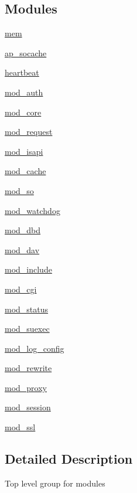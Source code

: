 \subsection*{Modules}
\begin{DoxyCompactItemize}
\item 
\hyperlink{group__MEM}{mem}
\item 
\hyperlink{group__AP__SOCACHE}{ap\+\_\+socache}
\item 
\hyperlink{group__HEARTBEAT}{heartbeat}
\item 
\hyperlink{group__MOD__AUTH}{mod\+\_\+auth}
\item 
\hyperlink{group__MOD__CORE}{mod\+\_\+core}
\item 
\hyperlink{group__MOD__REQUEST}{mod\+\_\+request}
\item 
\hyperlink{group__MOD__ISAPI}{mod\+\_\+isapi}
\item 
\hyperlink{group__MOD__CACHE}{mod\+\_\+cache}
\item 
\hyperlink{group__MOD__SO}{mod\+\_\+so}
\item 
\hyperlink{group__MOD__WATCHDOG}{mod\+\_\+watchdog}
\item 
\hyperlink{group__MOD__DBD}{mod\+\_\+dbd}
\item 
\hyperlink{group__MOD__DAV}{mod\+\_\+dav}
\item 
\hyperlink{group__MOD__INCLUDE}{mod\+\_\+include}
\item 
\hyperlink{group__MOD__CGI}{mod\+\_\+cgi}
\item 
\hyperlink{group__MOD__STATUS}{mod\+\_\+status}
\item 
\hyperlink{group__MOD__SUEXEC}{mod\+\_\+suexec}
\item 
\hyperlink{group__MOD__LOG__CONFIG}{mod\+\_\+log\+\_\+config}
\item 
\hyperlink{group__MOD__REWRITE}{mod\+\_\+rewrite}
\item 
\hyperlink{group__MOD__PROXY}{mod\+\_\+proxy}
\item 
\hyperlink{group__MOD__SESSION}{mod\+\_\+session}
\item 
\hyperlink{group__MOD__SSL}{mod\+\_\+ssl}
\end{DoxyCompactItemize}


\subsection{Detailed Description}
Top level group for modules 